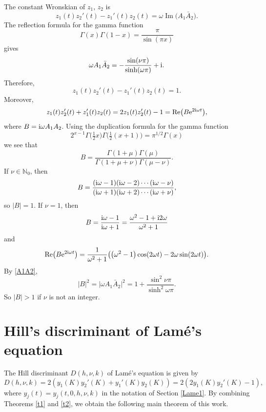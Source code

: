 \documentclass[pdftex]{sigma}
\newcommand{\N}{\mathbb{N}}
\numberwithin{equation}{section}
\begin{document}
The constant Wronskian of $z_1$, $z_2$ is
\[ z_1(t)z_2'(t)-z_1'(t)z_2(t) =\omega \operatorname{Im} \bigl(A_1\bar{A}_2\bigr) .\]
The reflection formula for the gamma function
\[ \Gamma(x)\Gamma(1-x)=\frac{\pi}{\sin(\pi x)}\]
gives
\begin{equation}\label{A1A2}
\omega A_1\bar{A}_2 = -\frac{\sin(\nu\pi)}{\sinh(\omega\pi)} +{\rm i}.
\end{equation}
Therefore,
\begin{equation*}%
 z_1(t)z_2'(t)-z_1'(t)z_2(t) =1.
\end{equation*}
Moreover,
\begin{equation}\label{zdisc}
 z_1(t)z_2'(t)+z_1'(t)z_2(t)=2z_1(t)z_2'(t)-1=\operatorname{Re}\bigl(B {\rm e}^{2{\rm i}\omega t}\bigr),
\end{equation}
where $B={\rm i}\omega A_1A_2$.
Using the duplication formula for the gamma function
\[ 2^{x-1}\Gamma\bigl(\tfrac12x\bigr)\Gamma\bigl(\tfrac12(x+1)\bigr)=\pi^{1/2} \Gamma(x)\]
we see that
\begin{equation}\label{B}
 B=\frac{\Gamma(1+\mu) \Gamma(\mu)}{\Gamma(1+\mu+\nu)\Gamma(\mu-\nu)} .
\end{equation}
If $\nu\in\N_0$, then
\[ B=\frac{({\rm i}\omega-1)({\rm i}\omega-2)\cdots({\rm i}\omega-\nu)}{({\rm i}\omega+1)({\rm i}\omega+2)\cdots({\rm i}\omega+\nu)}, \]
so $|B|=1$. If $\nu=1$, then
\[ B=\frac{{\rm i}\omega-1}{{\rm i}\omega+1}=\frac{\omega^2-1+{\rm i}2\omega}{\omega^2+1} \]
and
\[ \operatorname{Re}\bigl(B{\rm e}^{2{\rm i}\omega t}\bigr)=\frac{1}{\omega^2+1}\bigl(\bigl(\omega^2-1\bigr)\cos (2\omega t)-2\omega\sin(2\omega t)\bigr) .\]
By \eqref{A1A2},
\[ |B|^2=\big|\omega A_1 \bar{A}_2\big|^2=1+\frac{\sin^2\nu\pi}{\sinh^2\omega\pi}.\]
So $|B|>1$ if $\nu$ is not an integer.

\section{Hill's discriminant of Lam\'e's equation}\label{Hill}

The Hill discriminant $D(h,\nu,k)$ of Lam\'e's equation is given by \cite[p.~8]{MW}
\begin{equation}\label{hilldisc}
 D(h,\nu,k)=2(y_1(K)y_2'(K)+y_1'(K)y_2(K)) =2(2y_1(K)y_2'(K)-1),
 \end{equation}
where $y_j(t)=y_j(t,0,h,\nu,k)$ in the notation of Section \ref{Lame1}.
By combining Theorems \ref{t1} and \ref{t2}, we obtain the following main theorem of this work.
\end{document}
